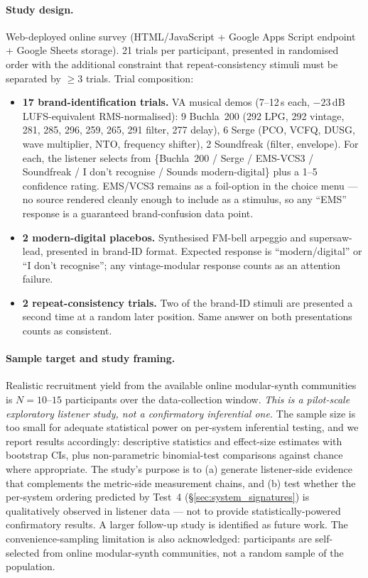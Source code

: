 \paragraph{Study design.} Web-deployed online survey (HTML/JavaScript + Google Apps Script endpoint + Google Sheets storage). 21 trials per participant, presented in randomised order with the additional constraint that repeat-consistency stimuli must be separated by $\geq 3$ trials. Trial composition:
\begin{itemize}\itemsep0pt
    \item \textbf{17 brand-identification trials.} VA musical demos (7--12\,s each, $-23$\,dB LUFS-equivalent RMS-normalised): 9 Buchla~200 (292 LPG, 292 vintage, 281, 285, 296, 259, 265, 291 filter, 277 delay), 6 Serge (PCO, VCFQ, DUSG, wave multiplier, NTO, frequency shifter), 2 Soundfreak (filter, envelope). For each, the listener selects from \{Buchla~200 / Serge / EMS-VCS3 / Soundfreak / I don't recognise / Sounds modern-digital\} plus a 1--5 confidence rating. EMS/VCS3 remains as a foil-option in the choice menu — no source rendered cleanly enough to include as a stimulus, so any ``EMS'' response is a guaranteed brand-confusion data point.
    \item \textbf{2 modern-digital placebos.} Synthesised FM-bell arpeggio and supersaw-lead, presented in brand-ID format. Expected response is ``modern/digital'' or ``I don't recognise''; any vintage-modular response counts as an attention failure.
    \item \textbf{2 repeat-consistency trials.} Two of the brand-ID stimuli are presented a second time at a random later position. Same answer on both presentations counts as consistent.
\end{itemize}

\paragraph{Sample target and study framing.} Realistic recruitment yield from the available online modular-synth communities is $N = 10$--$15$ participants over the data-collection window. \emph{This is a pilot-scale exploratory listener study, not a confirmatory inferential one.} The sample size is too small for adequate statistical power on per-system inferential testing, and we report results accordingly: descriptive statistics and effect-size estimates with bootstrap CIs, plus non-parametric binomial-test comparisons against chance where appropriate. The study's purpose is to (a) generate listener-side evidence that complements the metric-side measurement chains, and (b) test whether the per-system ordering predicted by Test~4 (\S\ref{sec:system_signatures}) is qualitatively observed in listener data --- not to provide statistically-powered confirmatory results. A larger follow-up study is identified as future work. The convenience-sampling limitation is also acknowledged: participants are self-selected from online modular-synth communities, not a random sample of the population.

